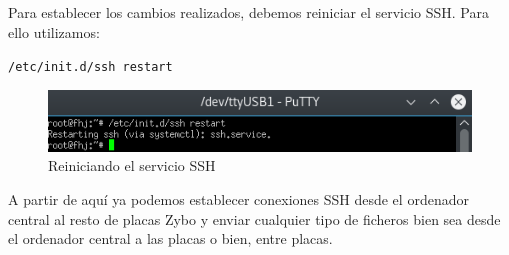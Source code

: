 \newpage
Para establecer los cambios realizados, debemos reiniciar el servicio SSH. Para ello utilizamos:
\begin{center}
	\texttt{/etc/init.d/ssh restart}
\end{center}
\begin{figure}[h]
	\centering
	\includegraphics[scale=0.8]{Anexos/Anexo2/Linux/SSHRestart.png}
	\caption{Reiniciando el servicio SSH}
	\label{Reiniciando el servicio SSH}
\end{figure}

A partir de aquí ya podemos establecer conexiones SSH desde el ordenador central al resto de placas Zybo y enviar cualquier tipo de ficheros bien sea desde el ordenador central a las placas o bien, entre placas.